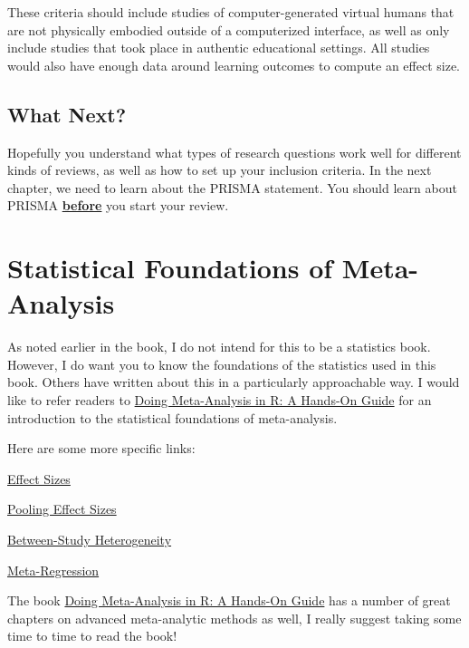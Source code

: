 \documentclass[
]{book}
\begin{document}
These criteria should include studies of computer-generated virtual humans that are not physically embodied outside of a computerized interface, as well as only include studies that took place in authentic educational settings. All studies would also have enough data around learning outcomes to compute an effect size.

\hypertarget{what-next}{%
\section{What Next?}\label{what-next}}

Hopefully you understand what types of research questions work well for different kinds of reviews, as well as how to set up your inclusion criteria. In the next chapter, we need to learn about the PRISMA statement. You should learn about PRISMA \ul{\textbf{before}} you start your review.

\hypertarget{statistical-foundations-of-meta-analysis}{%
\chapter{Statistical Foundations of Meta-Analysis}\label{statistical-foundations-of-meta-analysis}}

As noted earlier in the book, I do not intend for this to be a statistics book. However, I do want you to know the foundations of the statistics used in this book. Others have written about this in a particularly approachable way. I would like to refer readers to \protect\hyperlink{0}{Doing Meta-Analysis in R: A Hands-On Guide} \citep{harrer2021} for an introduction to the statistical foundations of meta-analysis.

Here are some more specific links:

\href{https://bookdown.org/MathiasHarrer/Doing_Meta_Analysis_in_R/effects.html}{Effect Sizes}

\href{https://bookdown.org/MathiasHarrer/Doing_Meta_Analysis_in_R/pooling-es.html}{Pooling Effect Sizes}

\href{https://bookdown.org/MathiasHarrer/Doing_Meta_Analysis_in_R/heterogeneity.html}{Between-Study Heterogeneity}

\href{https://bookdown.org/MathiasHarrer/Doing_Meta_Analysis_in_R/metareg.html}{Meta-Regression}

The book \protect\hyperlink{0}{Doing Meta-Analysis in R: A Hands-On Guide} \citep{harrer2021} has a number of great chapters on advanced meta-analytic methods as well, I really suggest taking some time to time to read the book!
\end{document}

